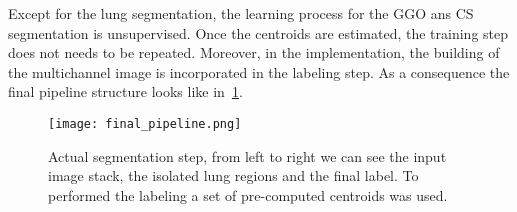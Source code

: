 \documentclass{standalone}
\begin{document}
	Except for the lung segmentation, the learning process for the GGO ans CS segmentation is unsupervised. Once the centroids are estimated, the training step does not needs to be repeated. Moreover, in the implementation, the building of the multichannel image is incorporated in the labeling step. As a consequence the final pipeline structure looks like in \figurename\,\ref{fig:FinalPipeline}.
	
	\begin{figure}[h!]
		\centering
		\texttt{[image: final\_pipeline.png]}
		\caption{Actual segmentation step, from left to right we can see the input image stack, the isolated lung regions and the final label. To performed the labeling a set of pre-computed centroids was used.}\label{fig:FinalPipeline}
	\end{figure}
	
	
	

	
	
	
\end{document}
